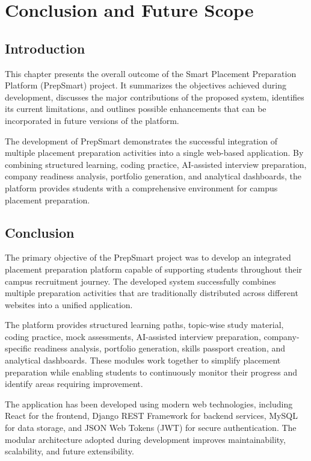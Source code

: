 \chapter{Conclusion and Future Scope}

\section{Introduction}

This chapter presents the overall outcome of the Smart Placement Preparation Platform (PrepSmart) project. It summarizes the objectives achieved during development, discusses the major contributions of the proposed system, identifies its current limitations, and outlines possible enhancements that can be incorporated in future versions of the platform.

The development of PrepSmart demonstrates the successful integration of multiple placement preparation activities into a single web-based application. By combining structured learning, coding practice, AI-assisted interview preparation, company readiness analysis, portfolio generation, and analytical dashboards, the platform provides students with a comprehensive environment for campus placement preparation.

\section{Conclusion}

The primary objective of the PrepSmart project was to develop an integrated placement preparation platform capable of supporting students throughout their campus recruitment journey. The developed system successfully combines multiple preparation activities that are traditionally distributed across different websites into a unified application.

The platform provides structured learning paths, topic-wise study material, coding practice, mock assessments, AI-assisted interview preparation, company-specific readiness analysis, portfolio generation, skills passport creation, and analytical dashboards. These modules work together to simplify placement preparation while enabling students to continuously monitor their progress and identify areas requiring improvement.

The application has been developed using modern web technologies, including React for the frontend, Django REST Framework for backend services, MySQL for data storage, and JSON Web Tokens (JWT) for secure authentication. The modular architecture adopted during development improves maintainability, scalability, and future extensibility.

